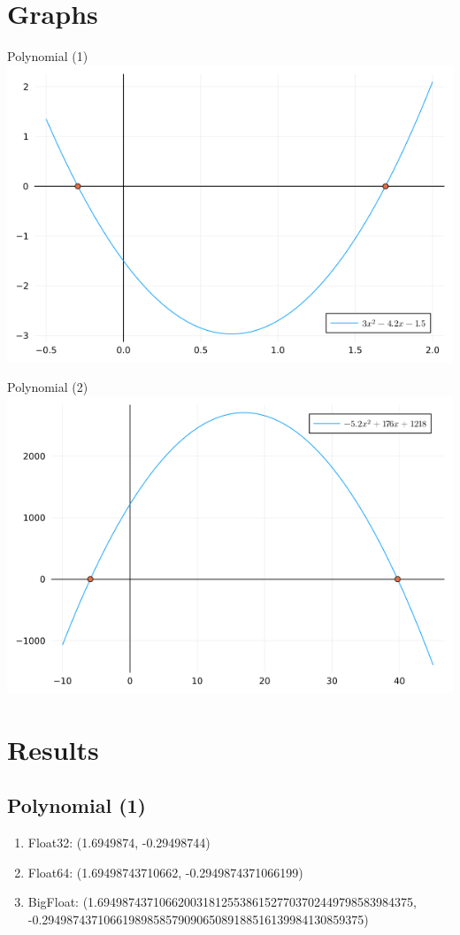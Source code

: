 \documentclass[12pt]{article}
\begin{document}
\section{Graphs}
    \begin{center}
        Polynomial (1) \\
        \includegraphics*[scale=0.6]{p1.png}
    \end{center}
    \begin{center}
        Polynomial (2) \\
        \includegraphics*[scale=0.6]{p2.png}
    \end{center}
\section{Results}
    \subsection*{Polynomial (1)}
        \begin{enumerate}
            \item Float32: (1.6949874, -0.29498744) 
            \item Float64: (1.69498743710662, -0.2949874371066199)
            \item BigFloat: (1.694987437106620031812553861527703702449798583984375, -0.2949874371066198985857909065089188516139984130859375)
        \end{enumerate}
\end{document}
